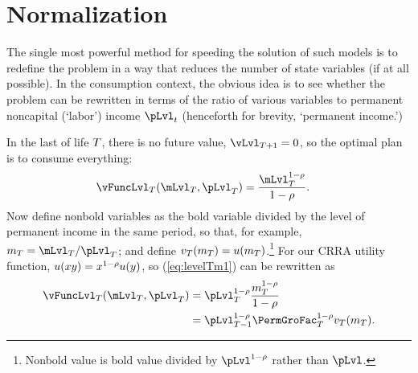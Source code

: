 \documentclass[SolvingMicroDSOPs]{subfiles}
\begin{document}
\hypertarget{normalization}{}
\section{Normalization}\label{sec:normalization}

The single most powerful method for speeding the solution of such models is to redefine the problem in a way that reduces the number of state variables (if at all possible).  In the consumption context, the obvious idea is to see whether the problem can be rewritten in terms of the ratio of various variables to permanent noncapital (`labor') income $\pLvl_{\prd}$ (henceforth for brevity, `permanent income.')

In the last {\interval} of life $T$, there is no future value, $\vLvl_{\trmT+1} = 0$, so the optimal plan is to consume everything:
\begin{equation}\begin{gathered}\begin{aligned}
      \vFuncLvl_{\trmT}(\mLvl_{\trmT},\pLvl_{\trmT})  & = \frac{\mLvl_{\trmT}^{1-\CRRA}}{1-\CRRA}. \label{eq:levelTm1}
    \end{aligned}\end{gathered}\end{equation}
Now define nonbold variables as the bold variable divided by the level of permanent income in the same period, so that, for example, $\mNrm_{\trmT}=\mLvl_{\trmT}/\pLvl_{\trmT}$; and define $v_{T}(m_{T}) = u(m_{T})$.\footnote{Nonbold value is bold value divided by $\pLvl^{1-\CRRA}$ rather than $\pLvl$.}  For our CRRA utility function, $u(xy)=x^{1-\rho}u(y)$, so (\ref{eq:levelTm1}) can be rewritten as
\begin{equation}\begin{gathered}\begin{aligned}
      \vFuncLvl_{\trmT}(\mLvl_{\trmT},\pLvl_{\trmT}) & = \pLvl_{\trmT}^{1-\CRRA}\frac{\mNrm_{\trmT}^{1-\CRRA}}{1-\CRRA}                       \\
                                                &= \pLvl_{\trmT-1}^{1-\CRRA}\PermGroFac_{\trmT}^{1-\CRRA}\vFunc_{\trmT}(\mNrm_{\trmT}). \label{eq:vT}
    \end{aligned}\end{gathered}\end{equation}
\end{document}
